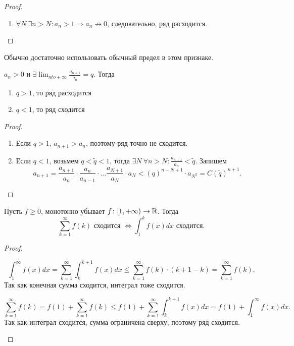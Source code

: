 \begin{prop}
\begin{description}
\begin{proof}
\begin{enumerate}
		    \item $ \forall  N  ~ \exists  n > N \colon  a_n > 1 \Longrightarrow a_n  \not\to 0$, следовательно, ряд расходится.
	        \end{enumerate}
	    \end{proof}
		\begin{note}
		    Обычно достаточно использовать обычный предел в этом признаке.
		\end{note}

	\item[\boxed{\texttt{Признак Даламбера}}] 
		$ a_n > 0$ и  $ \exists \lim_{n to + \infty} \frac{a_{n+1}}{a_n} = q$. Тогда 
	    \begin{enumerate}
			\item $ q > 1$, то ряд расходится
			\item  $ q < 1$, то ряд сходится
	    \end{enumerate}
	    \begin{proof}
		$ $
		\begin{enumerate}
		    \item Если  $ q > 1$, $ a_{n+1} > a_n$, поэтому ряд точно не сходится.
		    \item Если $ q < 1$, возьмем $ q < \tilde q < 1$, 
				тогда  $ \exists  N ~ \forall  n > N \colon \frac{a_{n+1}}{a_n} < \tilde q$.
			Запишем 
			 \[
			     a_{n+1} = \frac{a_{n+1}}{a_n} \cdot \frac{a_n}{a_{n-1}} \cdot  \ldots \frac{a_{N+1}}{a_N} \cdot a_N < (q)^{n - N + 1} \cdot a _{N^2}
				 = C(\tilde q)^{n+1}
			.\] 
		\end{enumerate}
	    \end{proof}

	\item[\boxed{\texttt{Интегральный признак}}] Пусть $f \ge 0 $, монотонно убывает $ f\colon [1, + \infty) \to  \mathbb{R}$. Тогда 
	    \[
		\sum_{k = 1}^{\infty} f(k) \text{ сходится } \Longleftrightarrow \int_{1}^{k} f(x) dx \text{ сходится}
	    .\] 
	    \begin{proof}
			$ $
			\begin{description}
			    \item {} 
					\[
						\int_{1}^{\infty} f(x)dx = \sum_{k=1}^{\infty} \int_{k}^{k+1} f(x) dx \le \sum_{k=1}^{\infty} f(k) \cdot (k+1-k) = \sum_{k=1}^{\infty} f(k)  
					.\] 
					Так как конечная сумма сходится, интеграл тоже сходится.
			    \item {} 
					\[
						\sum_{k=1}^{\infty} f(k) =
						f(1) + \sum_{k=1}^{\infty} f(k) \le
						f(1) + \sum_{k=1}^{\infty} \int_{k}^{k+1} f(x)dx = 
						f(1) + \int_{1}^{\infty} f(x)dx 
					.\] 
					Так как интеграл сходится, сумма ограничена сверху, поэтому ряд сходится.
			\end{description} 
	    \end{proof}
    \end{description}
\end{prop}

